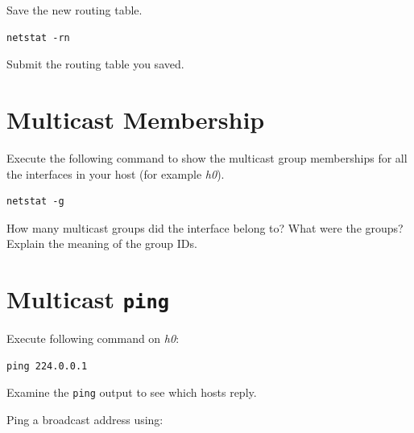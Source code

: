\documentclass{../UTNetLab}
\begin{document}
    Save the new routing table.

    \begin{lstlisting}
netstat -rn
    \end{lstlisting}
    
    \begin{report}
        \item Submit the routing table you saved.
    \end{report}

\section{Multicast Membership}
    Execute the following command to show the multicast group memberships for all the interfaces in your host (for example \textit{h0}).

    \begin{lstlisting}
netstat -g
    \end{lstlisting}
    
    \begin{report}
        \item How many multicast groups did the interface belong to? What were the groups? Explain the meaning of the group IDs.
    \end{report}

\section{Multicast \texttt{ping}}

    Execute following command on \textit{h0}:

    \begin{lstlisting}
ping 224.0.0.1
    \end{lstlisting}
    Examine the \lstinline{ping} output to see which hosts reply.

    Ping a broadcast address using:
\end{document}
